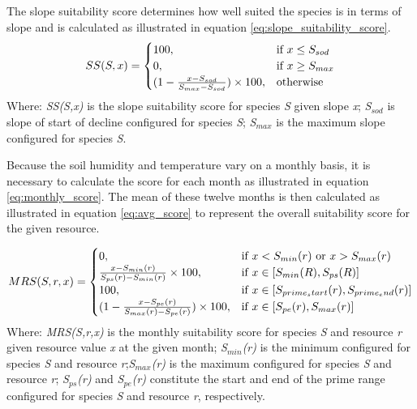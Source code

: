 The slope suitability score determines how well suited the species is in terms of slope and is calculated as illustrated in equation \ref{eq:slope_suitability_score}.\\

\begin{equation}
\centering
SS(S,x) = 
\begin{cases}
    100, & \text{if } x \leq S_{sod} \\
    0, & \text{if } x \geq S_{max} \\
	(1-\frac{x-S_{sod}}{S_{max}-S_{sod}}) \times 100, & \text{otherwise}
\end{cases}
\label{eq:slope_suitability_score}
\end{equation}
Where: \textit{SS(S,x)} is the slope suitability score for species \textit{S} given slope \textit{x}; \textit{S$_{sod}$} is slope of start of decline configured for species \textit{S}; \textit{S$_{max}$} is the maximum slope configured for species \textit{S}.

Because the soil humidity and temperature vary on a monthly basis, it is necessary to calculate the score for each month as illustrated in equation \ref{eq:monthly_score}. The mean of these twelve months is then calculated as illustrated in equation \ref{eq:avg_score} to represent the overall suitability score for the given resource.

\begin{equation}
\centering
MRS(S,r,x) = 
\begin{cases}
    0, & \text{if } x < S_{min}(r) \text{ or } x > S_{max}(r) \\
    \frac{x - S_{min}(r)}{S_{ps}(r) - S_{min}(r)} \times 100, & \text{if } x \in [S_{min}(R),S_{ps}(R)] \\
    100, & \text{if } x \in [S_{prime_start}(r),S_{prime_end}(r)] \\
    (1 - \frac{x - S_{pe}(r)}{S_{max}(r)-S_{pe}(r)}) \times 100, & \text{if } x \in [S_{pe}(r),S_{max}(r)] \\
\end{cases}
\label{eq:monthly_score}
\end{equation}
Where: \textit{MRS(S,r,x)} is the monthly suitability score for species \textit{S} and resource \textit{r} given resource value \textit{x} at the given month; \textit{S$_{min}$(r)} is the minimum configured for species \textit{S} and resource \textit{r};\textit{S$_{max}$(r)} is the maximum configured for species \textit{S} and resource \textit{r}; \textit{S$_{ps}$(r)} and \textit{S$_{pe}$(r)} constitute the start and end of the prime range configured for species \textit{S} and resource \textit{r}, respectively.\\

